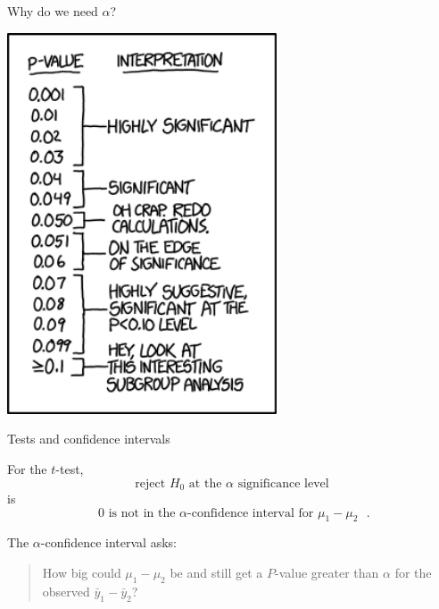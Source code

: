 \begin{frame}{Why do we need $\alpha$?}

    \begin{center}
        \includegraphics[width=0.6\textwidth]{p_values}
    \end{center}

\end{frame}


\begin{frame}{Tests and confidence intervals}

  For the $t$-test,
  \[  \text{reject $H_0$ at the $\alpha$ significance level} \]
  is 
  \[  \text{ 0 is not in the $\alpha$-confidence interval for $\mu_1-\mu_2$ }. \]


  \vspace{2em}


  The $\alpha$-confidence interval asks: 
  \begin{quote}
    How big could $\mu_1-\mu_2$ be and still get a $P$-value greater than $\alpha$ for the observed $\bar y_1 - \bar y_2$?
  \end{quote}


\end{frame}


